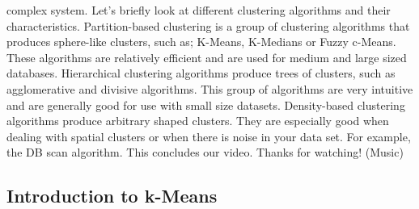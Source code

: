 complex system. Let's briefly look at different clustering algorithms and their characteristics. Partition-based clustering is a group of clustering algorithms that produces sphere-like clusters, such as; K-Means, K-Medians or Fuzzy c-Means. These algorithms are relatively efficient and are used for medium and large sized databases. Hierarchical clustering algorithms produce trees of clusters, such as agglomerative and divisive algorithms. This group of algorithms are very intuitive and are generally good for use with small size datasets. Density-based clustering algorithms produce arbitrary shaped clusters. They are especially good when dealing with spatial clusters or when there is noise in your data set. For example, the DB scan algorithm. This concludes our video. Thanks for watching! (Music)

\subsection{Introduction to k-Means}


